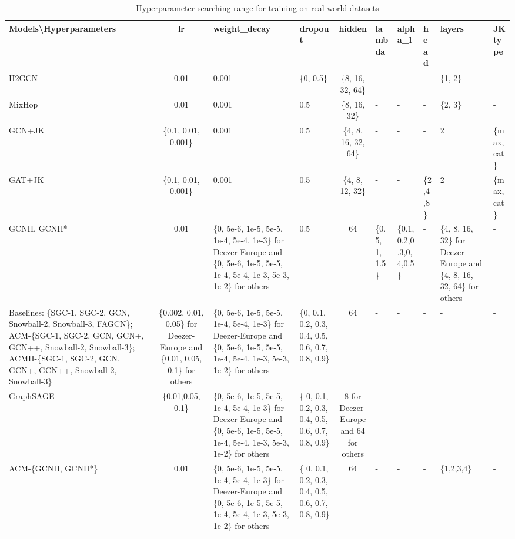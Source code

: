 \documentclass{article}
\newcommand{\0}{{\boldsymbol{0}}}
\newcommand{\6}{{\partial}}
\newcommand{\8}{{\infty}}
\newcommand{\4}{{\nabla}}
\begin{document}
\begin{table}[htbp]
  \centering
  \tiny
  \caption{Hyperparameter searching range for training on real-world datasets}
    \begin{tabular}{p{10.875em}|cp{10.125em}p{3.625em}cp{5.065em}p{4.875em}p{3.065em}p{5.5em}p{4.25em}}
    \toprule
    \toprule
    Models\textbackslash{}Hyperparameters & {lr} & weight\_decay & dropout & {hidden} & lambda & alpha\_l & head  & layers & JK type \\
    \midrule
    H2GCN & 0.01  & {0.001} & \{0, 0.5\} & \multicolumn{1}{p{7.125em}}{\{8, 16, 32, 64\}} & -     & -  & -  & \{1, 2\} & - \\
    \midrule
    MixHop & 0.01  & {0.001} & {0.5} & \multicolumn{1}{p{7.125em}}{\{8, 16, 32\}} & -   & -   & -   & \{2, 3\} & - \\
    \midrule
    GCN+JK & \multicolumn{1}{p{4.315em}}{\{0.1, 0.01, 0.001\}} & {0.001} & {0.5} & \multicolumn{1}{p{7.125em}}{\{4, 8, 16, 32, 64\}} & -     & -     & -     & {2} & \multicolumn{1}{p{7.125em}}{\{max, cat\}} \\
    \midrule
     GAT+JK & \multicolumn{1}{p{4.315em}}{\{0.1, 0.01, 0.001\}} & {0.001} & {0.5} & \multicolumn{1}{p{7.125em}}{\{4, 8, 12, 32\}} & -     & -     & \{2,4,8\} & {2} & \multicolumn{1}{p{7.125em}}{\{max, cat\}} \\
    \midrule
    GCNII, GCNII* & 0.01  & \{0, 5e-6, 1e-5, 5e-5, 1e-4, 5e-4, 1e-3\} for Deezer-Europe and \{0, 5e-6, 1e-5, 5e-5, 1e-4, 5e-4, 1e-3, 5e-3, 1e-2\} for others & {0.5} & 64    & \{0.5, 1, 1.5\} & \{0.1,0.2,0.3,0,4,0.5\} & -     & \{4, 8, 16, 32\} for Deezer-Europe and \{4, 8, 16, 32, 64\} for others & - \\
    \midrule
    Baselines: \{SGC-1, SGC-2, GCN, Snowball-2, Snowball-3, FAGCN\}; ACM-\{SGC-1, SGC-2, GCN, GCN+, GCN++, Snowball-2, Snowball-3\}; ACMII-\{SGC-1, SGC-2, GCN, GCN+, GCN++, Snowball-2, Snowball-3\} & \multicolumn{1}{p{4.315em}}{\{0.002, 0.01, 0.05\} for Deezer-Europe and \{0.01, 0.05, 0.1\} for others} & \{0, 5e-6, 1e-5, 5e-5, 1e-4, 5e-4, 1e-3\} for Deezer-Europe and \{0, 5e-6, 1e-5, 5e-5, 1e-4, 5e-4, 1e-3, 5e-3, 1e-2\} for others & \{0, 0.1, 0.2, 0.3, 0.4, 0.5, 0.6, 0.7, 0.8, 0.9\} & 64    & -     & -     & -     & -     & - \\
    \midrule
    GraphSAGE & \multicolumn{1}{p{4.315em}}{\{0.01,0.05, 0.1\}} & \{0, 5e-6, 1e-5, 5e-5, 1e-4, 5e-4, 1e-3\} for Deezer-Europe and \{0, 5e-6, 1e-5, 5e-5, 1e-4, 5e-4, 1e-3, 5e-3, 1e-2\} for others & \{ 0, 0.1, 0.2, 0.3, 0.4, 0.5, 0.6, 0.7, 0.8, 0.9\} & \multicolumn{1}{p{7.125em}}{8 for Deezer-Europe and 64 for others} & -     & -     & -     & -     & - \\
    \midrule
    ACM-\{GCNII, GCNII*\} & 0.01  & \{0, 5e-6, 1e-5, 5e-5, 1e-4, 5e-4, 1e-3\} for Deezer-Europe and \{0, 5e-6, 1e-5, 5e-5, 1e-4, 5e-4, 1e-3, 5e-3, 1e-2\} for others & \{ 0, 0.1, 0.2, 0.3, 0.4, 0.5, 0.6, 0.7, 0.8, 0.9\} & 64    & -     & -     & -     & \{1,2,3,4\} & - \\
    \bottomrule
    \bottomrule
    \end{tabular}\label{tab:real_world_datasets_hyperparameter_searching_range}\end{table} 
\end{document}
